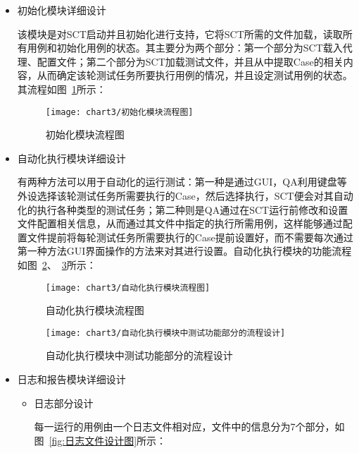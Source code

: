 		\begin{itemize}
			\item 初始化模块详细设计
			
				该模块是对SCT启动并且初始化进行支持，它将SCT所需的文件加载，读取所有用例和初始化用例的状态。其主要分为两个部分：第一个部分为SCT载入代理、配置文件；第二个部分为SCT加载测试文件，并且从中提取Case的相关内容，从而确定该轮测试任务所要执行用例的情况，并且设定测试用例的状态。其流程如图~\ref{fig:初始化模块流程图}所示：
			
				\begin{figure}[H] %
					\centering
					\texttt{[image: chart3/初始化模块流程图]}
					\caption{初始化模块流程图}
					\label{fig:初始化模块流程图}
				\end{figure}
			
			\item 自动化执行模块详细设计
			
				有两种方法可以用于自动化的运行测试：第一种是通过GUI，QA利用键盘等外设选择该轮测试任务所需要执行的Case，然后选择执行，SCT便会对其自动化的执行各种类型的测试任务；第二种则是QA通过在SCT运行前修改和设置文件配置相关信息，从而通过其文件中指定的执行所需用例，这样能够通过配置文件提前将每轮测试任务所需要执行的Case提前设置好，而不需要每次通过第一种方法GUI界面操作的方法来对其进行设置。自动化执行模块的功能流程如图~\ref{fig:自动化执行模块流程图}、~\ref{fig:自动化执行模块中测试功能部分的流程设计}所示：
			
				\begin{figure}[H] %
					\centering
					\texttt{[image: chart3/自动化执行模块流程图]}
					\caption{自动化执行模块流程图}
					\label{fig:自动化执行模块流程图}
				\end{figure}
			
				\begin{figure}[H] %
					\centering
					\texttt{[image: chart3/自动化执行模块中测试功能部分的流程设计]}
					\caption{自动化执行模块中测试功能部分的流程设计}
					\label{fig:自动化执行模块中测试功能部分的流程设计}
				\end{figure}		
			
			\item 日志和报告模块详细设计
				\begin{itemize}
					\item 日志部分设计
					
						每一运行的用例由一个日志文件相对应，文件中的信息分为7个部分，如图~\ref{fig:日志文件设计图}所示：
						

\end{itemize}
\end{itemize}
